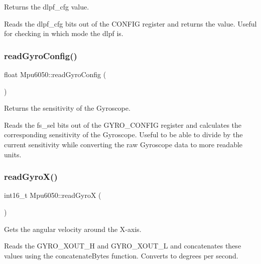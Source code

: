 Returns the dlpf\+\_\+cfg value. 

Reads the dlpf\+\_\+cfg bits out of the C\+O\+N\+F\+IG register and returns the value. Useful for checking in which mode the dlpf is. \mbox{\label{classMpu6050_a1a6e1a3452ee6d6d667c5ae425326772}} 
\subsubsection{\texorpdfstring{read\+Gyro\+Config()}{readGyroConfig()}}
{\footnotesize\ttfamily float Mpu6050\+::read\+Gyro\+Config (\begin{DoxyParamCaption}{ }\end{DoxyParamCaption})\hspace{0.3cm}{\ttfamily [virtual]}}



Returns the sensitivity of the Gyroscope. 

Reads the fs\+\_\+sel bits out of the G\+Y\+R\+O\+\_\+\+C\+O\+N\+F\+IG register and calculates the corresponding sensitivity of the Gyroscope. Useful to be able to divide by the current sensitivity while converting the raw Gyroscope data to more readable units. \mbox{\label{classMpu6050_a9ec9443071ff4c69d08aa5aada80a1ad}} 
\subsubsection{\texorpdfstring{read\+Gyro\+X()}{readGyroX()}}
{\footnotesize\ttfamily int16\+\_\+t Mpu6050\+::read\+GyroX (\begin{DoxyParamCaption}{ }\end{DoxyParamCaption})\hspace{0.3cm}{\ttfamily [virtual]}}



Gets the angular velocity around the X-\/axis. 

Reads the G\+Y\+R\+O\+\_\+\+X\+O\+U\+T\+\_\+H and G\+Y\+R\+O\+\_\+\+X\+O\+U\+T\+\_\+L and concatenates these values using the concatenate\+Bytes function. Converts to degrees per second. \mbox{\label{classMpu6050_a8047b6ee1c7e151664e5d8bc94dd3c11}} 
